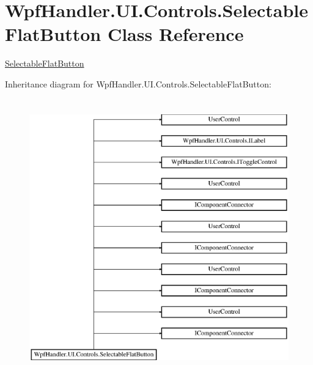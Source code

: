 \hypertarget{class_wpf_handler_1_1_u_i_1_1_controls_1_1_selectable_flat_button}{}\section{Wpf\+Handler.\+U\+I.\+Controls.\+Selectable\+Flat\+Button Class Reference}
\label{class_wpf_handler_1_1_u_i_1_1_controls_1_1_selectable_flat_button}


\mbox{\hyperlink{class_wpf_handler_1_1_u_i_1_1_controls_1_1_selectable_flat_button}{Selectable\+Flat\+Button}}  


Inheritance diagram for Wpf\+Handler.\+U\+I.\+Controls.\+Selectable\+Flat\+Button\+:\begin{figure}[H]
\begin{center}
\leavevmode
\includegraphics[height=12.000000cm]{d3/d10/class_wpf_handler_1_1_u_i_1_1_controls_1_1_selectable_flat_button}
\end{center}
\end{figure}
